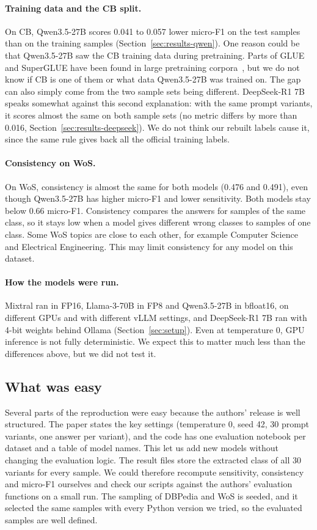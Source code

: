 \paragraph{Training data and the CB split.}
On CB, Qwen3.5-27B scores 0.041 to 0.057 lower micro-F1 on the test samples
than on the training samples (Section~\ref{sec:results-qwen}). One reason
could be that Qwen3.5-27B saw the CB training data during pretraining. Parts
of GLUE and SuperGLUE have been found in large pretraining
corpora~\cite{Elazar:2024}, but we do not know if CB is one of them or what
data Qwen3.5-27B was trained on. The gap can also simply come from the two
sample sets being different. DeepSeek-R1 7B speaks somewhat against this
second explanation: with the same prompt variants, it scores almost the same
on both sample sets (no metric differs by more than 0.016,
Section~\ref{sec:results-deepseek}). We do not think our rebuilt labels cause it,
since the same rule gives back all the official training labels.

\paragraph{Consistency on WoS.}
On WoS, consistency is almost the same for both models (0.476 and 0.491),
even though Qwen3.5-27B has higher micro-F1 and lower sensitivity. Both models
stay below 0.66 micro-F1. Consistency compares the answers for samples of the
same class, so it stays low when a model gives different wrong classes to
samples of one class. Some WoS topics are close to each other, for example
Computer Science and Electrical Engineering. This may limit consistency for
any model on this dataset.

\paragraph{How the models were run.}
Mixtral ran in FP16, Llama-3-70B in FP8 and Qwen3.5-27B in bfloat16, on
different GPUs and with different vLLM settings, and DeepSeek-R1 7B ran with
4-bit weights behind Ollama (Section~\ref{sec:setup}). Even at temperature 0, GPU
inference is not fully deterministic. We expect this to matter much less
than the differences above, but we did not test it.

\subsection{What was easy}
Several parts of the reproduction were easy because the authors' release is
well structured. The paper states the key settings (temperature 0, seed 42,
30 prompt variants, one answer per variant), and the code has one evaluation notebook per dataset and a table of model names. This let us add new models without changing the evaluation logic. The result files store the extracted class of all 30 variants for every sample. We could therefore recompute sensitivity, consistency and micro-F1 ourselves and check our scripts against the authors' evaluation functions on a small run. The sampling of DBPedia and WoS is seeded, and it selected the same samples with every Python version we tried, so the evaluated samples are well defined.

